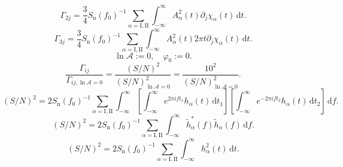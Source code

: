 \documentclass[a3paper]{ctexart}
\def\d{\mathrm{d}}
\begin{document}
    \begin{equation*}
        \Gamma_{2j}=\frac{3}{4}S_\text{n}(f_0)^{-1}\sum_{\alpha=\text{I},\text{II}}\int_{-\infty}^{\infty}A^2_\alpha(t)\partial_j \chi_\alpha(t)\,\d t.
    \end{equation*}
    \begin{equation*}
        \Gamma_{3j}=\frac{3}{4}S_\text{n}(f_0)^{-1}\sum_{\alpha=\text{I},\text{II}}\int_{-\infty}^{\infty}A^2_\alpha(t)2\pi t\partial_j \chi_\alpha(t)\,\d t.
    \end{equation*}
    \begin{equation*}
        \ln\mathcal{A}:=0,\quad\varphi_0:=0.
    \end{equation*}
    \begin{equation*}
        \frac{\Gamma_{ij}}{\Gamma_{ij,\ln\mathcal{A}=0}}=\frac{(S/N)^2}{(S/N)_{\ln\mathcal{A}=0}^2}=\frac{10^2}{(S/N)_{\ln\mathcal{A}=0}^2}.
    \end{equation*}
    \begin{equation*}
        (S/N)^2=2S_\text{n}(f_0)^{-1}\sum_{\alpha=\text{I},\text{II}}\int_{-\infty}^{\infty}\left[\int_{-\infty}^{\infty}e^{2\pi i ft_1}h_\alpha(t)\,\d t_1\right]\left[\int_{-\infty}^{\infty}e^{-2\pi i ft_2}h_\alpha(t)\,\d t_2\right]\,\d f.
    \end{equation*}
    \begin{equation*}
        (S/N)^2=2S_\text{n}(f_0)^{-1}\sum_{\alpha=\text{I},\text{II}}\int_{-\infty}^{\infty}\tilde{h}_\alpha^*(f)\tilde{h}_\alpha(f)\,\d f.
    \end{equation*}
    \begin{equation*}
        (S/N)^2=2S_\text{n}(f_0)^{-1}\sum_{\alpha=\text{I},\text{II}}\int_{-\infty}^{\infty}h_\alpha^2(t)\,\d t.
    \end{equation*}
\end{document}
